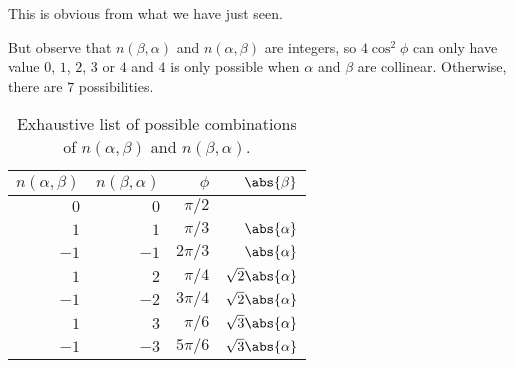 This is obvious from what we have just seen.

But observe that $n(\beta, \alpha)$ and $n(\alpha, \beta)$ are integers, so
$4\cos^2\phi$ can only have value $0$, $1$, $2$, $3$ or $4$ and
$4$ is only possible when $\alpha$ and $\beta$ are collinear. Otherwise,
there are $7$ possibilities.

\begin{table}[h]
	\centering
\begin{tabular}{@{}rrrr@{}} \toprule
	$n(\alpha, \beta)$ & $n(\beta, \alpha)$ &  $\phi$ & $\abs{\beta}$\\ \midrule
	$0$ & $0$ & $\pi/2$\\
	$1$ & $1$ & $\pi/3$ &  $\abs{\alpha}$ \\
	$-1$ & $-1$ & $2\pi/3$ & $\abs{\alpha}$ \\
	$1$ & $2$ & $\pi/4$ & $\sqrt{2}\abs{\alpha}$ \\
	$-1$ & $-2$ & $3\pi/4$ & $\sqrt{2}\abs{\alpha}$\\
	 $1$ & $3$ & $\pi/6$ & $\sqrt{3}\abs{\alpha}$ \\
	 $-1$ & $-3$ & $5\pi/6$ & $\sqrt{3}\abs{\alpha}$\\ \bottomrule
\end{tabular}
	\caption{Exhaustive list of possible combinations of $n(\alpha, \beta)$ and $n(\beta, \alpha)$.}
	\label{tbl:ncases}
\end{table}
